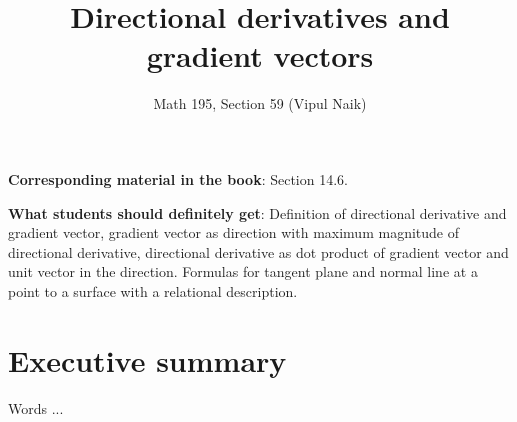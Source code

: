 \documentclass[10pt]{amsart}
\title{Directional derivatives and gradient vectors}
\author{Math 195, Section 59 (Vipul Naik)}
\begin{document}
\maketitle

{\bf Corresponding material in the book}: Section 14.6.

{\bf What students should definitely get}: Definition of directional
derivative and gradient vector, gradient vector as direction with
maximum magnitude of directional derivative, directional derivative as
dot product of gradient vector and unit vector in the
direction. Formulas for tangent plane and normal line at a point to a
surface with a relational description.

\section*{Executive summary}

Words ...
\end{document}

